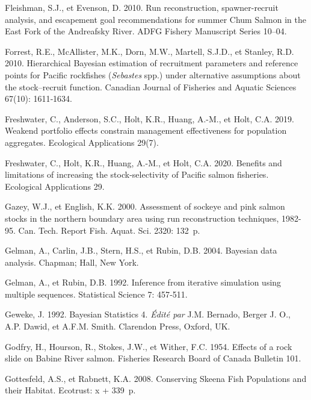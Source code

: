 \documentclass[french,11pt]{book}
\begin{document}
\begin{CSLReferences}{1}{0}
Fleishman, S.J., et Evenson, D. 2010. {Run reconstruction, spawner-recruit analysis, and escapement goal recommendations for summer Chum Salmon in the East Fork of the Andreafsky River}. ADFG Fishery Manuscript Series 10--04.

Forrest, R.E., McAllister, M.K., Dorn, M.W., Martell, S.J.D., et Stanley, R.D. 2010. {Hierarchical Bayesian estimation of recruitment parameters and reference points for Pacific rockfishes (\emph{Sebastes} spp.) under alternative assumptions about the stock--recruit function}. Canadian Journal of Fisheries and Aquatic Sciences 67(10): 1611‑1634.

Freshwater, C., Anderson, S.C., Holt, K.R., Huang, A.-M., et Holt, C.A. 2019. {Weakend portfolio effects constrain management effectiveness for population aggregates}. {Ecological Applications} 29(7).

Freshwater, C., Holt, K.R., Huang, A.-M., et Holt, C.A. 2020. {Benefits and limitations of increasing the stock-selectivity of Pacific salmon fisheries}. Ecological Applications 29.

Gazey, W.J., et English, K.K. 2000. {Assessment of sockeye and pink salmon stocks in the northern boundary area using run reconstruction techniques, 1982-95}. Can. Tech. Report Fish. Aquat. Sci. 2320: 132~p.

Gelman, A., Carlin, J.B., Stern, H.S., et Rubin, D.B. 2004. {Bayesian data analysis}. Chapman; Hall, New York.

Gelman, A., et Rubin, D.B. 1992. Inference from iterative simulation using multiple sequences. Statistical Science 7: 457‑511.

Geweke, J. 1992. Bayesian Statistics 4. \emph{Édité par} J.M. Bernado, Berger J. O., A.P. Dawid, et A.F.M. Smith. Clarendon Press, Oxford, UK.

Godfry, H., Hourson, R., Stokes, J.W., et Wither, F.C. 1954. {Effects of a rock slide on Babine River salmon}. {Fisheries Research Board of Canada Bulletin} 101.

Gottesfeld, A.S., et Rabnett, K.A. 2008. {Conserving Skeena Fish Populations and their Habitat}. Ecotrust: x + 339~p.


\end{CSLReferences}
\end{document}
